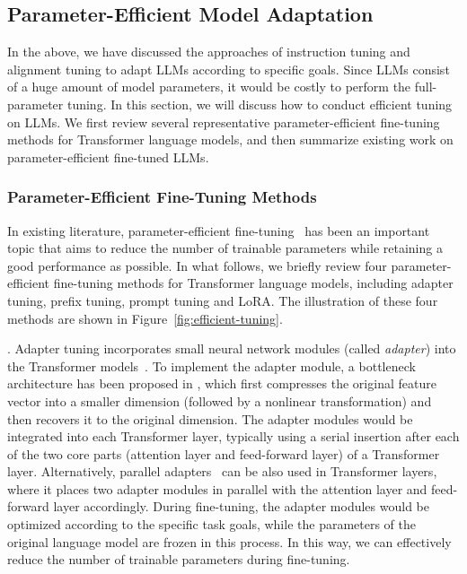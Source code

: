 \subsection{Parameter-Efficient Model Adaptation}\label{sec-PEFT}
In the above, we have discussed the approaches of instruction tuning and alignment tuning to adapt LLMs according to specific goals. Since  LLMs consist of a huge amount of model parameters, it would be costly to perform the full-parameter tuning. In this section, we will discuss how to conduct efficient tuning  on LLMs.  We first review several representative parameter-efficient fine-tuning methods for Transformer language models, and then summarize existing work on parameter-efficient fine-tuned LLMs. 

\subsubsection{Parameter-Efficient Fine-Tuning Methods}\label{sec-PEFT-methods}
In existing literature, parameter-efficient fine-tuning~\cite{Li-ACL-2021-prefix,Lester-ACL-2021-The,Hu-ICLR-2022-LoRA} has been an important topic that aims to reduce the number of trainable parameters while retaining a good performance as possible. In what follows, we briefly review four  parameter-efficient fine-tuning methods for Transformer language models, including adapter tuning, prefix tuning, prompt tuning and 
LoRA. The illustration of these four methods are shown in Figure~\ref{fig:efficient-tuning}.


. Adapter tuning  incorporates small neural network modules (called \emph{adapter}) into the Transformer models~\cite{Houlsby-ICML-2019-Parameter}. To implement  the adapter module, a bottleneck architecture has been proposed in \cite{Houlsby-ICML-2019-Parameter,Hu-arXiv-2023}, which first compresses the original feature vector into a smaller dimension (followed by a nonlinear transformation) and then recovers it to the original dimension.  
The adapter modules would be integrated into each Transformer layer, typically using a serial insertion after each of the two core parts (\ie  attention layer and feed-forward layer) of a Transformer layer. 
Alternatively,  parallel adapters~\cite{He-ICLR-2022-towards} can be also used in Transformer layers, where it places two adapter modules in parallel with the attention layer and feed-forward layer accordingly.   
During fine-tuning, the adapter modules would be optimized according to the  specific task goals, while the parameters of the original language model are  frozen in this process. 
In this way, we can effectively reduce the number of trainable parameters during fine-tuning.


